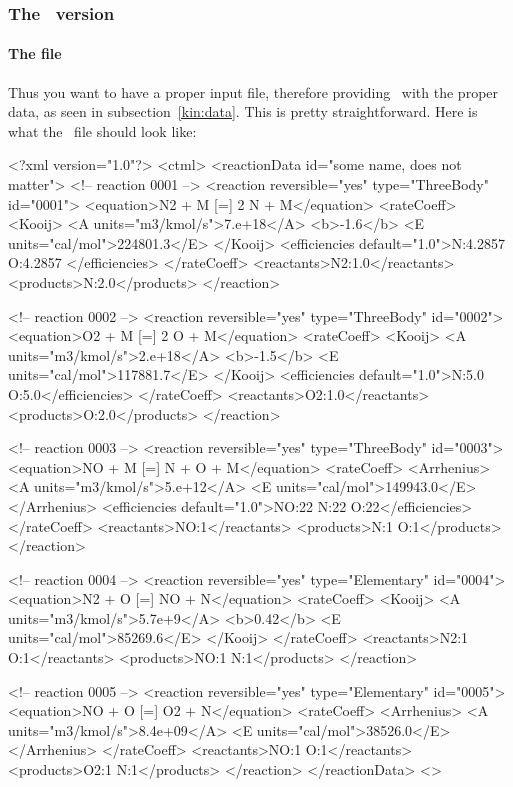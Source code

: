 \subsubsection{The \XML\ version}

\paragraph{The file}

Thus you want to have a proper input file, therefore providing
\Antioch\ with the proper data, as seen in subsection~\ref{kin:data}.
This is pretty straightforward. Here is what the \XML\ file should look like:
\begin{xml}
<?xml version="1.0"?>
<ctml>
  <reactionData id="some name, does not matter">
    <!-- reaction 0001    -->
    <reaction reversible="yes" type="ThreeBody" id="0001">
      <equation>N2 + M [=] 2 N + M</equation>
      <rateCoeff>
        <Kooij>
           <A units="m3/kmol/s">7.e+18</A>
           <b>-1.6</b>
           <E units="cal/mol">224801.3</E>
        </Kooij>
        <efficiencies default="1.0">N:4.2857 O:4.2857 </efficiencies>
      </rateCoeff>
      <reactants>N2:1.0</reactants>
      <products>N:2.0</products>
    </reaction>

    <!-- reaction 0002    -->
    <reaction reversible="yes" type="ThreeBody" id="0002">
      <equation>O2 + M [=] 2 O + M</equation>
      <rateCoeff>
        <Kooij>
           <A units="m3/kmol/s">2.e+18</A>
           <b>-1.5</b>
           <E units="cal/mol">117881.7</E>
        </Kooij>
        <efficiencies default="1.0">N:5.0 O:5.0</efficiencies>
      </rateCoeff>
      <reactants>O2:1.0</reactants>
      <products>O:2.0</products>
    </reaction>

    <!-- reaction 0003    -->
    <reaction reversible="yes" type="ThreeBody" id="0003">
      <equation>NO + M [=] N + O + M</equation>
      <rateCoeff>
        <Arrhenius>
           <A units="m3/kmol/s">5.e+12</A>
           <E units="cal/mol">149943.0</E>
        </Arrhenius>
        <efficiencies default="1.0">NO:22 N:22 O:22</efficiencies>
      </rateCoeff>
      <reactants>NO:1</reactants>
      <products>N:1 O:1</products>
    </reaction>

    <!-- reaction 0004    -->
    <reaction reversible="yes" type="Elementary" id="0004">
      <equation>N2 + O [=] NO + N</equation>
      <rateCoeff>
        <Kooij>
           <A units="m3/kmol/s">5.7e+9</A>
           <b>0.42</b>
           <E units="cal/mol">85269.6</E>
        </Kooij>
      </rateCoeff>
      <reactants>N2:1 O:1</reactants>
      <products>NO:1 N:1</products>
    </reaction>

    <!-- reaction 0005    -->
    <reaction reversible="yes" type="Elementary" id="0005">
      <equation>NO + O [=] O2 + N</equation>
      <rateCoeff>
        <Arrhenius>
           <A units="m3/kmol/s">8.4e+09</A>
           <E units="cal/mol">38526.0</E>
        </Arrhenius>
      </rateCoeff>
      <reactants>NO:1 O:1</reactants>
      <products>O2:1 N:1</products>
    </reaction>
  </reactionData>
<\ctml>
\end{xml}

